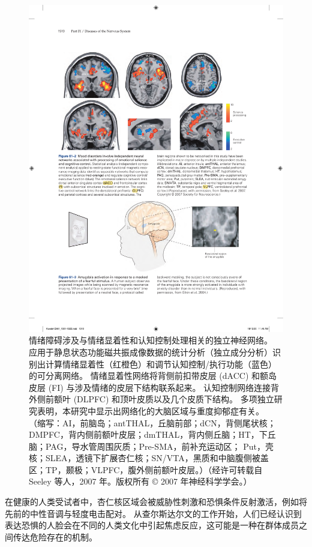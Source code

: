 \begin{figure}[htbp]
	\centering
	\includegraphics[width=0.9\linewidth]{chap61/fig_61_2}
	\caption{情绪障碍涉及与情绪显着性和认知控制处理相关的独立神经网络。 应用于静息状态功能磁共振成像数据的统计分析（独立成分分析）识别出计算情绪显着性（红橙色）和调节认知控制/执行功能（蓝色）的可分离网络。 情绪显着性网络将背侧前扣带皮层 (dACC) 和额岛皮层 (FI) 与涉及情绪的皮层下结构联系起来。 认知控制网络连接背外侧前额叶 (DLPFC) 和顶叶皮质以及几个皮质下结构。 多项独立研究表明，本研究中显示出网络化的大脑区域与重度抑郁症有关。 （缩写：AI，前脑岛；antTHAL，丘脑前部；dCN，背侧尾状核；DMPFC，背内侧前额叶皮层；dmTHAL，背内侧丘脑；HT，下丘脑；PAG，导水管周围灰质；Pre-SMA，前补充运动区； Put，壳核；SLEA，透镜下扩展杏仁核；SN/VTA，黑质和中脑腹侧被盖区；TP，颞极；VLPFC，腹外侧前额叶皮层。）（经许可转载自 Seeley 等人，2007 年。版权所有 © 2007 年神经科学学会。）}
	\label{fig:61_2}
\end{figure}

在健康的人类受试者中，杏仁核区域会被威胁性刺激和恐惧条件反射激活，例如将先前的中性音调与轻度电击配对。 从查尔斯达尔文的工作开始，人们已经认识到表达恐惧的人脸会在不同的人类文化中引起焦虑反应，这可能是一种在群体成员之间传达危险存在的机制。


